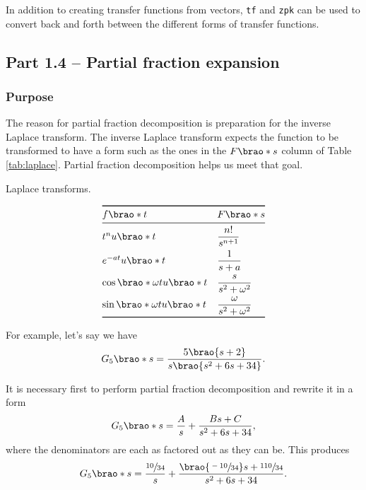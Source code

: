 \documentclass[12pt]{article}
\DeclarePairedDelimiter\brao()%
\begin{document}
In addition to creating transfer functions from vectors, 
\texttt{tf} and \texttt{zpk} can be used to convert back and forth between the different forms of transfer functions.

\subsection{Part 1.4 -- Partial fraction expansion}

\subsubsection{Purpose}

The reason for partial fraction decomposition is preparation for the inverse Laplace transform.
The inverse Laplace transform expects the function to be transformed to have a form such as the ones in the $F\brao*s$ column of Table \ref{tab:laplace}.
Partial fraction decomposition helps us meet that goal.

\begin{table}[h!]
    \centering
    \caption{Laplace transforms.}
    \[
        \begin{array}{@{}ll@{}}
            \toprule
                f\brao*t & F\brao*s
            \\*
            \midrule
                t^n u\brao*t
                    & \dfrac{n!}{s^{n+1}}
            \\*[0.75em]
                e^{-at}u\brao*t
                    & \dfrac{1}{s+a}
            \\*[0.75em]
                \cos\brao*{\omega t}u\brao*t
                    & \dfrac{s}{s^2 + \omega^2}
            \\*[0.75em]
                \sin\brao*{\omega t}u\brao*t
                    & \dfrac\omega{s^2 + \omega^2}
            \\*
            \bottomrule
        \end{array}
    \]
    \label{tab:laplace}
\end{table}

For example, let's say we have
\begin{equation}
    G_5\brao*s = \frac{5\brao{s + 2}}{s\brao{s^2 + 6s + 34}}.
\end{equation}

It is necessary first to perform partial fraction decomposition and rewrite it in a form
\begin{equation}
    G_5\brao*s = \frac{A}s + \frac{Bs + C}{s^2 + 6s + 34},
\end{equation}
where the denominators are each as factored out as they can be.
This produces
\begin{equation}
    G_5\brao*s = \frac{\sfrac{10}{34}}s + \frac{\brao{\sfrac{-10}{34}}s + \sfrac{110}{34}}{s^2 + 6s + 34}.
\end{equation}
\end{document}
